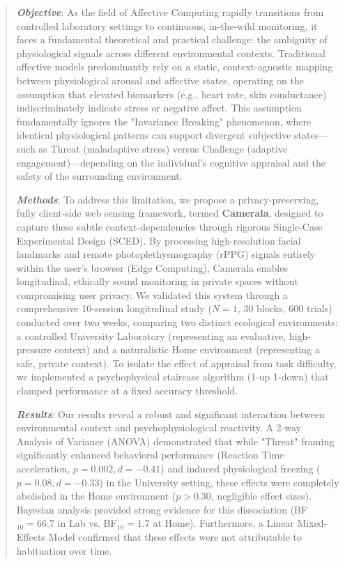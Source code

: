 \documentclass[journal]{IEEEtran}
\begin{document}
\begin{abstract}
\textbf{\textit{Objective}}: As the field of Affective Computing rapidly transitions from controlled laboratory settings to continuous, in-the-wild monitoring, it faces a fundamental theoretical and practical challenge: the ambiguity of physiological signals across different environmental contexts. Traditional affective models predominantly rely on a static, context-agnostic mapping between physiological arousal and affective states, operating on the assumption that elevated biomarkers (e.g., heart rate, skin conductance) indiscriminately indicate stress or negative affect. This assumption fundamentally ignores the "Invariance Breaking" phenomenon, where identical physiological patterns can support divergent subjective states—such as Threat (maladaptive stress) versus Challenge (adaptive engagement)—depending on the individual's cognitive appraisal and the safety of the surrounding environment.

\textbf{\textit{Methods}}: To address this limitation, we propose a privacy-preserving, fully client-side web sensing framework, termed \textbf{Camerala}, designed to capture these subtle context-dependencies through rigorous Single-Case Experimental Design (SCED). By processing high-resolution facial landmarks and remote photoplethysmography (rPPG) signals entirely within the user's browser (Edge Computing), Camerala enables longitudinal, ethically sound monitoring in private spaces without compromising user privacy. We validated this system through a comprehensive 10-session longitudinal study ($N=1$, 30 blocks, 600 trials) conducted over two weeks, comparing two distinct ecological environments: a controlled University Laboratory (representing an evaluative, high-pressure context) and a naturalistic Home environment (representing a safe, private context). To isolate the effect of appraisal from task difficulty, we implemented a psychophysical staircase algorithm (1-up 1-down) that clamped performance at a fixed accuracy threshold.

\textbf{\textit{Results}}: Our results reveal a robust and significant interaction between environmental context and psychophysiological reactivity. A 2-way Analysis of Variance (ANOVA) demonstrated that while "Threat" framing significantly enhanced behavioral performance (Reaction Time acceleration, $p=0.002, d=-0.41$) and induced physiological freezing ($p=0.08, d=-0.33$) in the University setting, these effects were completely abolished in the Home environment ($p>0.30$, negligible effect sizes). Bayesian analysis provided strong evidence for this dissociation (BF$_{10}=66.7$ in Lab vs. BF$_{10}=1.7$ at Home). Furthermore, a Linear Mixed-Effects Model confirmed that these effects were not attributable to habituation over time.


\end{abstract}
\end{document}
